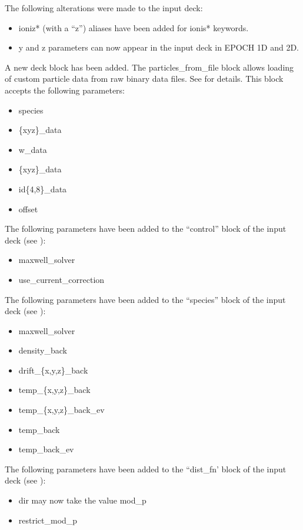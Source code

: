 The following alterations were made to the input deck:
\begin{itemize}
\item ioniz* (with a ``z'') aliases have been added for ionis* keywords.
\item y and z parameters can now appear in the input deck in EPOCH 1D and 2D.
\end{itemize}
\bigskip

A new deck block has been added. The particles\_from\_file block allows loading
of custom particle data from raw binary data files. See
 for details.
This block accepts the following parameters:
\begin{itemize}
\item species
\item \{xyz\}\_data
\item w\_data
\item \{xyz\}\_data
\item id\{4,8\}\_data
\item offset
\end{itemize}
\bigskip

\noindent The following parameters have been added to the ``control'' block of
the input deck (see ):
\begin{itemize}
\item maxwell\_solver
\item use\_current\_correction
\end{itemize}
\bigskip

\noindent The following parameters have been added to the ``species'' block of
the input deck (see ):
\begin{itemize}
\item maxwell\_solver
\item density\_back
\item drift\_\{x,y,z\}\_back
\item temp\_\{x,y,z\}\_back
\item temp\_\{x,y,z\}\_back\_ev
\item temp\_back
\item temp\_back\_ev
\end{itemize}
\bigskip

\noindent The following parameters have been added to the ``dist\_fn' block of
the input deck (see ):
\begin{itemize}
\item dir may now take the value mod\_p
\item restrict\_mod\_p
\end{itemize}

